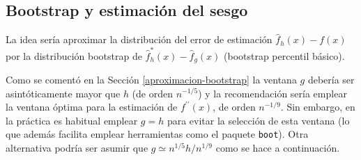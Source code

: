 \documentclass[
]{book}
\theoremstyle{break}
\theoremstyle{nonumberplain}
\begin{document}
\subsection{Bootstrap y estimación del sesgo}\label{bootstrap-y-estimaciuxf3n-del-sesgo}

La idea sería aproximar la distribución del error de estimación \(\hat f_h(x) - f(x)\) por la distribución bootstrap de \(\hat f^{\ast}_h(x) - \hat f_g(x)\) (bootstrap percentil básico).

Como se comentó en la Sección \ref{aproximacion-bootstrap} la ventana \(g\) debería ser asintóticamente mayor que \(h\) (de orden \(n^{-1/5}\)) y la recomendación sería emplear la ventana óptima para la estimación de \(f^{\prime \prime }\left( x \right)\), de orden \(n^{-1/9}\).
Sin embargo, en la práctica es habitual emplear \(g=h\) para evitar la selección de esta ventana (lo que además facilita emplear herramientas como el paquete \texttt{boot}).
Otra alternativa podría ser asumir que \(g \simeq n^{1/5}h/n^{1/9}\) como se hace a continuación.
\end{document}
